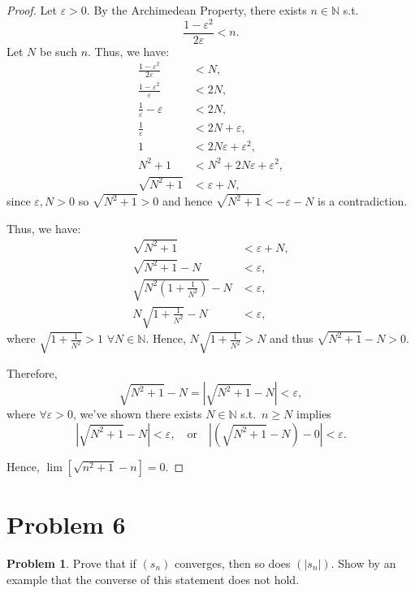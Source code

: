 \documentclass{article}
\theoremstyle{definition}
\newtheorem*{problem}{Problem}
\begin{document}
\begin{proof}
Let $\varepsilon > 0$. By the Archimedean Property, there exists $n \in \mathbb{N}$ s.t.
\[
\frac{1 - \varepsilon^2}{2\varepsilon} < n.
\]
Let $N$ be such $n$. Thus, we have:
\begin{align*}
\frac{1 - \varepsilon^2}{2\varepsilon} &< N, \\
\frac{1 - \varepsilon^2}{\varepsilon} &< 2N, \\
\frac{1}{\varepsilon} - \varepsilon &< 2N, \\
\frac{1}{\varepsilon} &< 2N + \varepsilon, \\
1 &< 2N\varepsilon + \varepsilon^2, \\
N^2 + 1 &< N^2 + 2N\varepsilon + \varepsilon^2, \\
\sqrt{N^2 + 1} &< \varepsilon + N,
\end{align*}
since $\varepsilon, N > 0$ so $\sqrt{N^2 + 1} > 0$ and hence $\sqrt{N^2 + 1} < -\varepsilon - N$ is a contradiction.

Thus, we have:
\begin{align*}
\sqrt{N^2 + 1} &< \varepsilon + N, \\
\sqrt{N^2 + 1} - N &< \varepsilon, \\
\sqrt{N^2\left(1 + \frac{1}{N^2}\right)} - N &< \varepsilon, \\
N\sqrt{1 + \frac{1}{N^2}} - N &< \varepsilon,
\end{align*}
where $\sqrt{1 + \frac{1}{N^2}} > 1$ $\forall N \in \mathbb{N}$. Hence, $N\sqrt{1 + \frac{1}{N^2}} > N$ and thus $\sqrt{N^2 + 1} - N > 0$.

Therefore,
\[
\sqrt{N^2 + 1} - N = \left|\sqrt{N^2 + 1} - N\right| < \varepsilon,
\]
where $\forall \varepsilon > 0$, we've shown there exists $N \in \mathbb{N}$ s.t.\ $n \geq N$ implies
\[
\left|\sqrt{N^2 + 1} - N\right| < \varepsilon, \quad \text{or} \quad \left|\left(\sqrt{N^2 + 1} - N\right) - 0\right| < \varepsilon.
\]

Hence, $\lim\left[\sqrt{n^2 + 1} - n\right] = 0$.
\end{proof}

\clearpage
\section{Problem 6}

\begin{problem}
Prove that if $(s_n)$ converges, then so does $(|s_n|)$. Show by an example that the converse of this statement does not hold.
\end{problem}
\end{document}
